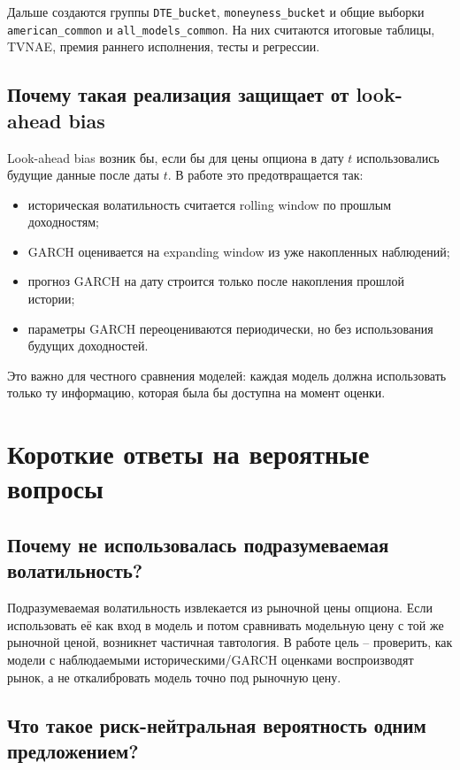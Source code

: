\documentclass[11pt,a4paper]{article}
\begin{document}
Дальше создаются группы \texttt{DTE\_bucket}, \texttt{moneyness\_bucket} и общие выборки \texttt{american\_common} и \texttt{all\_models\_common}. На них считаются итоговые таблицы, TVNAE, премия раннего исполнения, тесты и регрессии.

\subsection{Почему такая реализация защищает от look-ahead bias}

Look-ahead bias возник бы, если бы для цены опциона в дату $t$ использовались будущие данные после даты $t$. В работе это предотвращается так:

\begin{itemize}
    \item историческая волатильность считается rolling window по прошлым доходностям;
    \item GARCH оценивается на expanding window из уже накопленных наблюдений;
    \item прогноз GARCH на дату строится только после накопления прошлой истории;
    \item параметры GARCH переоцениваются периодически, но без использования будущих доходностей.
\end{itemize}

Это важно для честного сравнения моделей: каждая модель должна использовать только ту информацию, которая была бы доступна на момент оценки.

\section{Короткие ответы на вероятные вопросы}

\subsection*{Почему не использовалась подразумеваемая волатильность?}

Подразумеваемая волатильность извлекается из рыночной цены опциона. Если использовать её как вход в модель и потом сравнивать модельную цену с той же рыночной ценой, возникнет частичная тавтология. В работе цель -- проверить, как модели с наблюдаемыми историческими/GARCH оценками воспроизводят рынок, а не откалибровать модель точно под рыночную цену.

\subsection*{Что такое риск-нейтральная вероятность одним предложением?}
\end{document}
